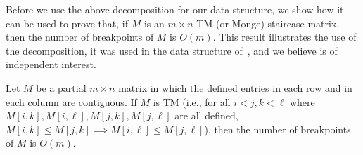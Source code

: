 \documentclass{llncs}
\begin{document}
Before we use the above decomposition for our data structure, we show how it can be used  to prove that, if $M$ is an $m\times n$ TM (or Monge) staircase
matrix, then the number of breakpoints of $M$ is
$O(m)$. This result illustrates the use of the decomposition, it was used in the data structure of~\cite{ourICALP}, and we believe is of independent interest.


\begin{theorem}\label{lemma:partial-breakpoints}
Let $M$ be a partial $m\times n$ matrix in which the defined entries in each row
and in each column are
contiguous.
If $M$ is TM (i.e., for all $i<j, k<\ell$ where
$M[i,k],M[i,\ell],M[j,k],M[j,\ell]$ are all defined, $M[i,k] \leq M[j,k]
\implies M[i,\ell] \leq M[j,\ell]$), then the number of breakpoints of $M$ is $O(m)$.
\end{theorem}
\end{document}
